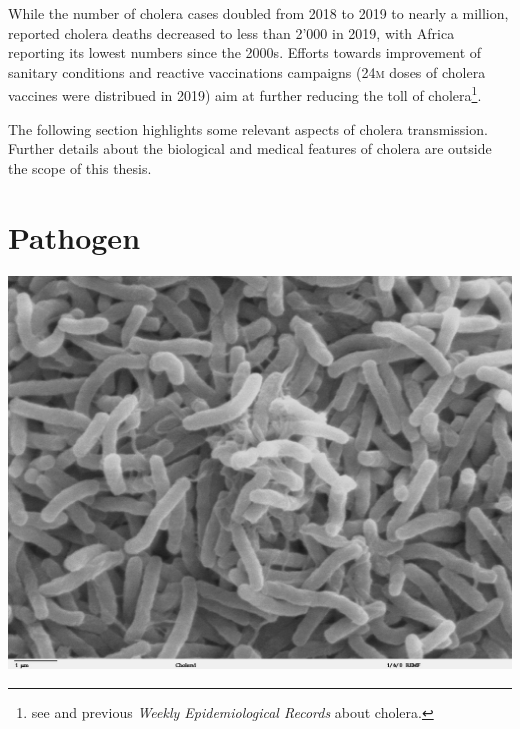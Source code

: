 While the number of cholera cases doubled from 2018 to 2019 to nearly a million, reported cholera deaths decreased to less than 2'000 in 2019, with Africa reporting its lowest numbers since the 2000s. Efforts towards improvement of sanitary conditions and reactive vaccinations campaigns (24\textsc{m} doses of cholera vaccines were distribued in 2019) aim at further reducing the toll of cholera\footnote{see  and previous \textit{Weekly Epidemiological Records} about cholera.}. 

The following section highlights some relevant aspects of cholera transmission. Further details about the biological and medical features of cholera are outside the scope of this thesis.

\section{Pathogen} 
\begin{marginfigure}[6\baselineskip]
\centering
\includegraphics{fig/vibrio}
\label{fig:bacteria}
\end{marginfigure}
